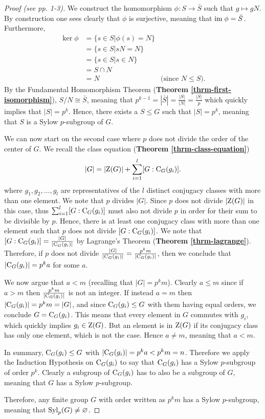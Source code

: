 \begin{proof}[Proof (see \cite{mann_2011} pp. 1-3)]
    We construct the homomorphism $\phi: S \to \bar{S}$ such that $g \mapsto gN$. By construction one sees clearly that $\phi$ is surjective, meaning that $\mathrm{im}\; \phi = \bar{S}$. Furthermore,
    \begin{align*}
        \ker\phi &= \{s \in S \vert \phi(s) = N\}\\
        &= \{s \in S \vert sN = N \}\\
        &= \{s \in S \vert s \in N \}\\
        &= S \cap N\\
        &= N & \text{(since } N \leq S).
    \end{align*}
    By the Fundamental Homomorphism Theorem (\textbf{Theorem \ref{thrm-first-isomorphism}}), $S/N \cong \bar{S}$, meaning that $p^{k-1} = |\bar{S}| = \frac{|S|}{|N|} = \frac{|S|}{p}$ which quickly implies that $|S| = p^k$. Hence, there exists a $S \leq G$ such that $|S| = p^k$, meaning that $S$ is a Sylow $p$-subgroup of $G$.

    We can now start on the second case where $p$ does not divide the order of the center of $G$. We recall the class equation (\textbf{Theorem \ref{thrm-class-equation}})
    \[
        |G| = |\mathrm{Z}(G)| + \sum_{i=1}^l [G:\mathrm{C}_{G}(g_i)].
    \]
    where $g_1, g_2, \dots, g_l$ are representatives of the $l$ distinct conjugacy classes with more than one element. We note that $p$ divides $|G|$. Since $p$ does not divide $|\mathrm{Z}(G)|$ in this case, thus $\sum_{i=1}^l [G:\mathrm{C}_{G}(g_i)]$ must also not divide $p$ in order for their sum to be divisible by $p$. Hence, there is at least one conjugacy class with more than one element such that $p$ does not divide $[G:\mathrm{C}_{G}(g_i)]$. We note that $[G:\mathrm{C}_{G}(g_i)] = \frac{|G|}{|\mathrm{C}_{G}(g_i)|}$ by Lagrange's Theorem (\textbf{Theorem \ref{thrm-lagrange}}). Therefore, if $p$ does not divide $\frac{|G|}{|\mathrm{C}_{G}(g_i)|} = \frac{p^k m}{|\mathrm{C}_{G}(g_i)|}$, then we conclude that $|\mathrm{C}_{G}(g_i)| = p^ka$ for some $a$.

    We now argue that $a < m$ (recalling that $|G| = p^km$). Clearly $a \leq m$ since if $a > m$ then $\frac{p^k m}{|\mathrm{C}_{G}(g_i)|}$ is not an integer. If instead $a = m$ then $|\mathrm{C}_{G}(g_i)| = p^km = |G|$, and since $\mathrm{C}_{G}(g_i) \leq G$ with them having equal orders, we conclude $G = \mathrm{C}_{G}(g_i)$. This means that every element in $G$ commutes with $g_i$, which quickly implies $g_i \in \mathrm{Z}(G)$. But an element is in $\mathrm{Z}(G)$ if its conjugacy class has only one element, which is not the case. Hence $a \neq m$, meaning that $a < m$.

    In summary, $\mathrm{C}_{G}(g_i) \leq G$ with $|\mathrm{C}_{G}(g_i)| = p^ka < p^km = n$. Therefore we apply the Induction Hypothesis on $\mathrm{C}_{G}(g_i)$ to say that $\mathrm{C}_{G}(g_i)$ has a Sylow $p$-subgroup of order $p^k$. Clearly a subgroup of $\mathrm{C}_{G}(g_i)$ has to also be a subgroup of $G$, meaning that $G$ has a Sylow $p$-subgroup.

    Therefore, any finite group $G$ with order written as $p^k m$ has a Sylow $p$-subgroup, meaning that $\mathrm{Syl}_{p}(G) \neq \varnothing$.
\end{proof}

